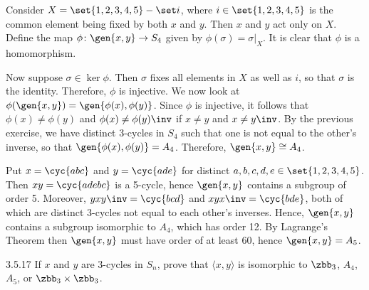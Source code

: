 \begin{solenum}
    \item Consider $X = \set{1, 2, 3, 4, 5} - \set i$, where $i \in \set{1, 2, 3, 4, 5}$ is the common element being fixed by both $x$ and $y$.
	Then $x$ and $y$ act only on $X$.
	Define the map $\phi \colon \gen{x, y} \to S_4$ given by $\phi(\sigma) = \sigma|_X$.
	It is clear that $\phi$ is a homomorphism. 
    
    Now suppose $\sigma \in \ker\phi$.
	Then $\sigma$ fixes all elements in $X$ as well as $i$, so that $\sigma$ is the identity.
	Therefore, $\phi$ is injective.
	We now look at $\phi(\gen{x, y}) = \gen{\phi(x), \phi(y)}$.
	Since $\phi$ is injective, it follows that $\phi(x) \neq \phi(y)$ and $\phi(x) \neq \phi(y)\inv$ if $x \neq y$ and $x \neq y\inv$.
	By the previous exercise, we have distinct 3-cycles in $S_4$ such that one is not equal to the other's inverse, so that $\gen{\phi(x), \phi(y)} = A_4$.
	Therefore, $\gen{x, y} \cong A_4$.
    \item Put $x = \cyc{a b c}$ and $y = \cyc{a d e}$ for distinct $a, b, c, d, e \in \set{1, 2, 3, 4, 5}$.
	Then $xy = \cyc{a d e b c}$ is a 5-cycle, hence $\gen{x, y}$ contains a subgroup of order 5.
	Moreover, $yxy\inv = \cyc{b c d}$ and $xyx\inv = \cyc{b d e}$, both of which are distinct 3-cycles not equal to each other's inverses.
	Hence, $\gen{x, y}$ contains a subgroup isomorphic to $A_4$, which has order 12.
	By Lagrange's Theorem then $\gen{x, y}$ must have order of at least 60, hence $\gen{x, y} = A_5$.
\end{solenum}

\begin{exercise}{3.5.17}
    If $x$ and $y$ are $3$-cycles in $S_n$, prove that $\langle x,y\rangle$ is isomorphic to $\zbb_3$, $A_4$, $A_5$, or $\zbb_3\times\zbb_3$.
\end{exercise}

